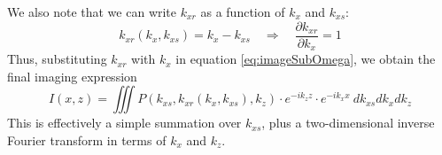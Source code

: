 \documentclass{article}%
\begin{document}
We also note that we can write $k_{xr}$ as a function of $k_x$ and $k_{xs}$:
\begin{equation}
	k_{xr}(k_x,k_{xs}) = k_x - k_{xs} \quad \Longrightarrow \quad 
		\frac{\partial k_{xr}}{\partial k_x} = 1
\label{eq:kxrFunc}
\end{equation}
Thus, substituting $k_{xr}$ with $k_x$ in equation \ref{eq:imageSubOmega}, we obtain the final imaging expression
\begin{equation}
	I(x,z) = \iiint P(k_{xs},k_{xr}(k_x,k_{xs}),k_z)
		\cdot e^{-i k_z z} \cdot e^{-i k_x x} \ dk_{xs} dk_x dk_z
\label{eq:imageSubOmega}
\end{equation}
This is effectively a simple summation over $k_{xs}$, plus a two-dimensional inverse Fourier transform in terms of $k_x$ and $k_z$.




\appendix
\end{document}
